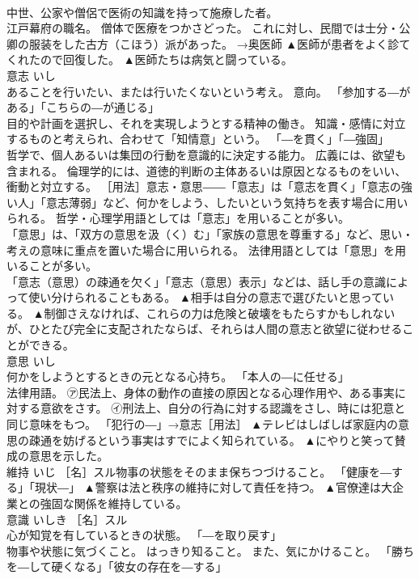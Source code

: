 \documentclass[8pt]{extreport}
\begin{document}
\begin{CJK}{UTF8}{min}
\\	中世、公家や僧侶で医術の知識を持って施療した者。 
\\	江戸幕府の職名。 僧体で医療をつかさどった。 これに対し、民間では士分・公卿の服装をした古方（こほう）派があった。 →奥医師	▲医師が患者をよく診てくれたので回復した。 ▲医師たちは病気と闘っている。
\\	意志	いし	
\\	あることを行いたい、または行いたくないという考え。 意向。 「参加する―がある」「こちらの―が通じる」 
\\	目的や計画を選択し、それを実現しようとする精神の働き。 知識・感情に対立するものと考えられ、合わせて「知情意」という。 「―を貫く」「―強固」 
\\	哲学で、個人あるいは集団の行動を意識的に決定する能力。 広義には、欲望も含まれる。 倫理学的には、道徳的判断の主体あるいは原因となるものをいい、衝動と対立する。 ［用法］意志・意思――「意志」は「意志を貫く」「意志の強い人」「意志薄弱」など、何かをしよう、したいという気持ちを表す場合に用いられる。 哲学・心理学用語としては「意志」を用いることが多い。 
\\	「意思」は、「双方の意思を汲（く）む」「家族の意思を尊重する」など、思い・考えの意味に重点を置いた場合に用いられる。 法律用語としては「意思」を用いることが多い。 
\\	「意志（意思）の疎通を欠く」「意志（意思）表示」などは、話し手の意識によって使い分けられることもある。	▲相手は自分の意志で選びたいと思っている。 ▲制御さえなければ、これらの力は危険と破壊をもたらすかもしれないが、ひとたび完全に支配されたならば、それらは人間の意志と欲望に従わせることができる。
\\	意思	いし	
\\	何かをしようとするときの元となる心持ち。 「本人の―に任せる」 
\\	法律用語。 ㋐民法上、身体の動作の直接の原因となる心理作用や、ある事実に対する意欲をさす。 ㋑刑法上、自分の行為に対する認識をさし、時には犯意と同じ意味をもつ。 「犯行の―」→意志［用法］	▲テレビはしばしば家庭内の意思の疎通を妨げるという事実はすでによく知られている。 ▲にやりと笑って賛成の意思を示した。
\\	維持	いじ	［名］スル物事の状態をそのまま保ちつづけること。 「健康を―する」「現状―」	▲警察は法と秩序の維持に対して責任を持つ。 ▲官僚達は大企業との強固な関係を維持している。
\\	意識	いしき	［名］スル 
\\	心が知覚を有しているときの状態。 「―を取り戻す」 
\\	物事や状態に気づくこと。 はっきり知ること。 また、気にかけること。 「勝ちを―して硬くなる」「彼女の存在を―する」 

\end{CJK}
\end{document}
